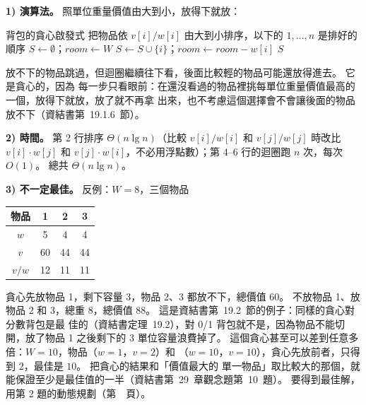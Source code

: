 \begin{pastsoln}
\textbf{1) 演算法。} 照單位重量價值由大到小，放得下就放：

\begin{pseudo}[unbreakable]{背包的貪心啟發式}
    \State 把物品依 $v[i] / w[i]$ 由大到小排序，以下的 $1, \ldots, n$ 是排好的順序
    \State $S \gets \emptyset$；$\mathit{room} \gets W$
            \State $S \gets S \cup \{i\}$；$\mathit{room} \gets \mathit{room} - w[i]$
        \EndIf
    \EndFor
    \State \Return $S$
\EndFunction
\end{pseudo}

放不下的物品跳過，但迴圈繼續往下看，後面比較輕的物品可能還放得進去。 它是貪心的，因為
每一步只看眼前：在還沒看過的物品裡挑每單位重量價值最高的一個，放得下就放，放了就不再拿
出來，也不考慮這個選擇會不會讓後面的物品放不下（資結書第~19.1.6~節）。

\textbf{2) 時間。} 第 2 行排序 $\Theta(n \lg n)$（比較 $v[i] / w[i]$ 和 $v[j] / w[j]$ 時改比
$v[i] \cdot w[j]$ 和 $v[j] \cdot w[i]$，不必用浮點數）；第 4--6 行的迴圈跑 $n$ 次，每次
$O(1)$。 總共 $\Theta(n \lg n)$。

\textbf{3) 不一定最佳。} 反例：$W = 8$，三個物品
\begin{center}
\begin{tabular}{cccc}
\toprule
物品 & 1 & 2 & 3 \\
\midrule
$w$ & 5 & 4 & 4 \\
$v$ & 60 & 44 & 44 \\
$v / w$ & 12 & 11 & 11 \\
\bottomrule
\end{tabular}
\end{center}
貪心先放物品 1，剩下容量 $3$，物品 2、3 都放不下，總價值 $60$。 不放物品 1、放物品 2 和
3，總重 $8$，總價值 $88$。 這是資結書第~19.2~節的例子：同樣的貪心對分數背包是最
佳的（資結書定理~19.2），對 0/1 背包就不是，因為物品不能切開，放了物品 1 之後剩下的
$3$ 單位容量浪費掉了。 這個貪心甚至可以差到任意多倍：$W = 10$，物品（$w = 1$，$v = 2$）和
（$w = 10$，$v = 10$），貪心先放前者，只得到 $2$，最佳是 $10$。 把貪心的結果和「價值最大的
單一物品」取比較大的那個，就能保證至少是最佳值的一半（資結書第~29~章觀念題第~10~題）。
要得到最佳解，用第 2 題的動態規劃（第~\pageref{px:nccu-112-dsa-02}~頁）。
\end{pastsoln}
